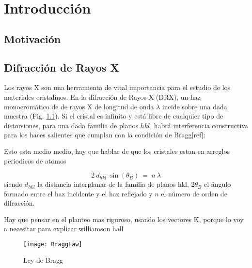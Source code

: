 \chapter{Introducci\'on}
\graphicspath{{./figs/01_intro/}}
\section{Motivación}\label{S:motivacion}

\section{Difracción de Rayos X}\label{S:DRX}
Los rayos X son una herramienta de vital importancia para el estudio de los materiales cristalinos. 
En la difracción de Rayos X (DRX), un haz monocromático de de rayos X de longitud de onda $\lambda$ incide sobre una dada muestra (Fig. \ref{fig:Bragg}). 
Si el cristal es infinito y está libre de cualquier tipo de distorsiones, para una dada familia de planos ${hkl}$, habrá interferencia constructiva para los haces salientes que cumplan con la condición de Bragg[ref]:

Esto esta medio medio, hay que hablar de que los cristales estan en arreglos periodicos de atomos

\begin{equation}
  2 \ d_{hkl} \ \sin(\theta_{B}) \ = \ n \ \lambda
  \label{eq:Bragg}
\end{equation}
\noindent
siendo $d_{hkl}$ la distancia interplanar de la familia de planos {hkl}, 2$\theta_{B}$ el ángulo formado entre el haz incidente y el haz reflejado y $n$ el número de orden de difracción. 

Hay que pensar en el planteo mas riguroso, usando los vectores K, porque lo voy a necesitar para explicar williamson hall


\begin{figure}[htb!]
  \centering
  \texttt{[image: BraggLaw]}
  \caption{Ley de Bragg}
  \label{fig:Bragg}
\end{figure}

